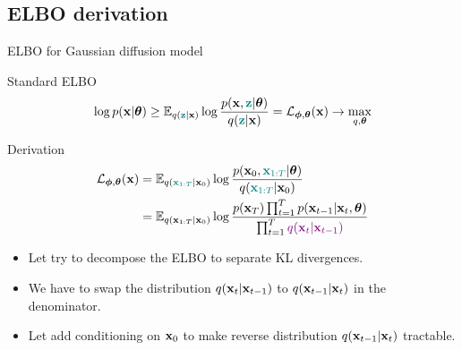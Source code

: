 \subsection{ELBO derivation}
\begin{frame}{ELBO for Gaussian diffusion model}
	\begin{block}{Standard ELBO}
		\vspace{-0.3cm}
		\[
			\log p(\mathbf{x} | \boldsymbol{\theta}) \geq \mathbb{E}_{q({\color{teal}\mathbf{z}} | \mathbf{x})} \log \frac{p(\mathbf{x}, {\color{teal}\mathbf{z}} | \boldsymbol{\theta})}{q({\color{teal}\mathbf{z}} | \mathbf{x})} = \mathcal{L}_{\boldsymbol{\phi}, \boldsymbol{\theta}}(\mathbf{x}) \rightarrow \max_{q, \boldsymbol{\theta}}
		\]
		\vspace{-0.5cm}
	\end{block}
	\begin{block}{Derivation}
		\vspace{-0.5cm}
		\begin{align*}
			\mathcal{L}_{\boldsymbol{\phi}, \boldsymbol{\theta}}(\mathbf{x}) &= \mathbb{E}_{q({\color{teal}\mathbf{x}_{1:T}} | \mathbf{x}_0)} \log \frac{p(\mathbf{x}_0, {\color{teal}\mathbf{x}_{1:T}} | \boldsymbol{\theta})}{q({\color{teal}\mathbf{x}_{1:T}} | \mathbf{x}_0)} \\
			& = \mathbb{E}_{q(\mathbf{x}_{1:T} | \mathbf{x}_0)} \log \frac{p(\mathbf{x}_T) \prod_{t=1}^T p(\mathbf{x}_{t-1} | \mathbf{x}_t, \boldsymbol{\theta}) }{\prod_{t=1}^T {\color{violet}q(\mathbf{x}_t | \mathbf{x}_{t-1})}}
		\end{align*}
		\vspace{-0.3cm}
		\begin{itemize}
			\item Let try to decompose the ELBO to separate KL divergences.
			\item We have to swap the distribution $q(\mathbf{x}_t | \mathbf{x}_{t - 1})$ to $q(\mathbf{x}_{t - 1} | \mathbf{x}_t)$ in the denominator.
			\item Let add conditioning on $\mathbf{x}_0$ to make reverse distribution $q(\mathbf{x}_{t - 1} | \mathbf{x}_t)$ tractable.
		\end{itemize}
	\end{block}
	
\end{frame}
